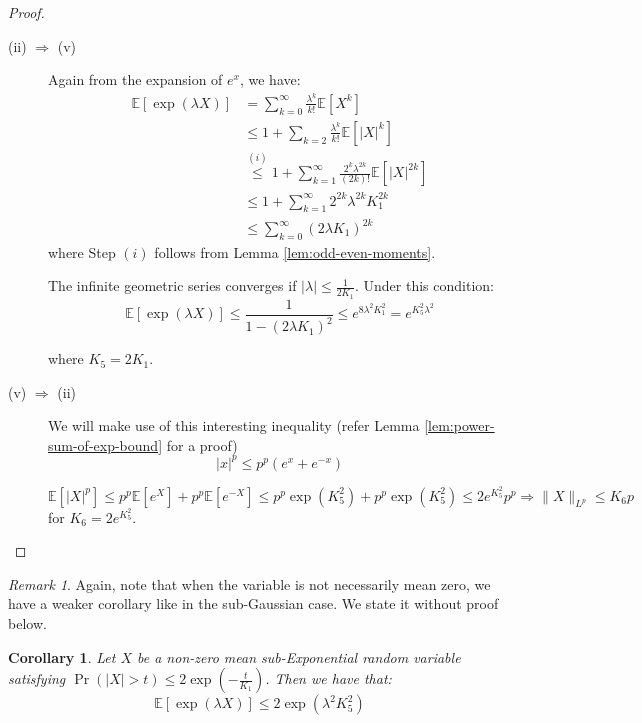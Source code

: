 \documentclass{article}
\newtheorem{corollary}{Corollary}[subsection]
\theoremstyle{remark}
\newtheorem*{remark}{Remark}
\newcommand{\Exp}{\mathbb{E}}
\begin{document}
\begin{proof}
\begin{description}
\item [(ii) \(\Rightarrow\) (v)] Again from the expansion of \(e^{x}\), we have:
\begin{align*}
\Exp[\exp(\lambda X)] &= \sum_{k=0}^{\infty} \frac{\lambda^{k}}{k!}\Exp[X^{k}] \\
&\leq 1 + \sum_{k=2} \frac{\lambda^{k}}{k!}\Exp[|X|^{k}] \\
&\overset{(i)}\leq 1 + \sum_{k=1}^{\infty} \frac{2^{k}\lambda^{2k}}{(2k)!}\Exp[|X|^{2k}] \\
&\leq 1 + \sum_{k=1}^{\infty} 2^{2k}\lambda^{2k} K_{1}^{2k} \\
&\leq \sum_{k=0}^{\infty} (2\lambda K_{1})^{2k}
\end{align*}
where Step \((i)\) follows from Lemma \ref{lem:odd-even-moments}.

The infinite geometric series converges if \(|\lambda| \leq \frac{1}{2K_{1}}\). Under this condition:
\begin{equation*}
\Exp[\exp(\lambda X)] \leq \frac{1}{1 - (2\lambda K_{1})^{2}} \leq e^{8\lambda^{2}K_{1}^{2}} = e^{K_{5}^{2}\lambda^{2}}
\end{equation*}

where \(K_{5} = 2K_{1}\).

\item [(v) \(\Rightarrow\) (ii)] We will make use of this interesting inequality (refer Lemma \ref{lem:power-sum-of-exp-bound} for a proof)
\begin{equation*}
|x|^{p} \leq p^{p}(e^{x} + e^{-x})
\end{equation*}

\begin{equation*}
\Exp[|X|^{p}] \leq p^{p}\Exp[e^{X}] + p^{p}\Exp[e^{-X}] \leq p^{p}\exp(K_{5}^{2}) + p^{p}\exp(K_{5}^{2}) \leq 2e^{K_{5}^{2}}p^{p} \Rightarrow \|X\|_{L^{p}} \leq K_{6}p
\end{equation*}
for \(K_{6} = 2e^{K_{5}^{2}}\).
\end{description}
\end{proof}

\begin{remark}
Again, note that when the variable is not necessarily mean zero, we have a weaker corollary like in the sub-Gaussian case. We state it without proof below.
\begin{corollary}
Let \(X\) be a non-zero mean sub-Exponential random variable satisfying \(\Pr(|X| > t) \leq 2\exp\left(-\frac{t}{K_{1}}\right)\). Then we have that:
\begin{equation*}
\Exp[\exp(\lambda X)] \leq 2\exp(\lambda^{2}K_{5}^{2})
\end{equation*}
\end{corollary}
\end{remark}
\end{document}
